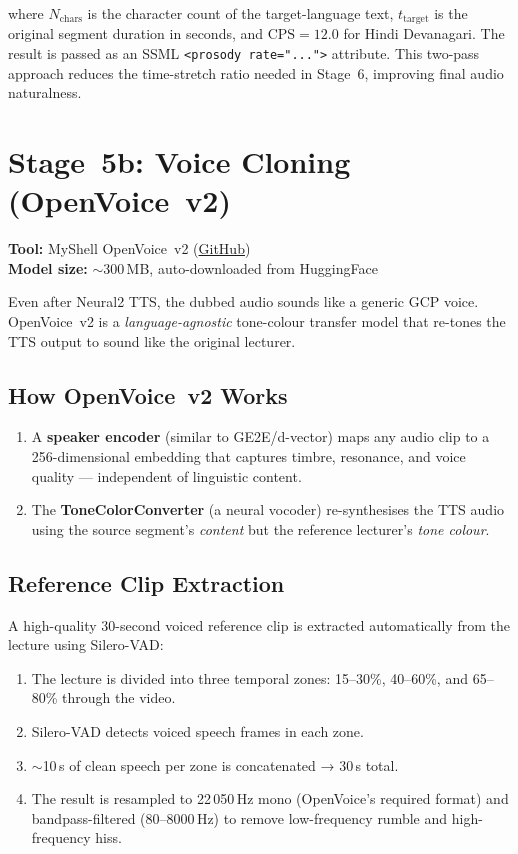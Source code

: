 \documentclass[12pt,a4paper]{article}
\begin{document}
where $N_\text{chars}$ is the character count of the target-language text,
$t_\text{target}$ is the original segment duration in seconds, and
$\text{CPS} = 12.0$ for Hindi Devanagari.  The result is passed as
an SSML \texttt{<prosody rate="...">} attribute.  This two-pass approach
reduces the time-stretch ratio needed in Stage~6, improving final audio
naturalness.

\section{Stage~5b: Voice Cloning (OpenVoice~v2)}

\textbf{Tool:} MyShell OpenVoice~v2 (\href{https://github.com/myshell-ai/OpenVoice}{GitHub})\\
\textbf{Model size:} $\sim$300\,MB, auto-downloaded from HuggingFace

Even after Neural2 TTS, the dubbed audio sounds like a generic GCP voice.
OpenVoice~v2 is a \emph{language-agnostic} tone-colour transfer model that
re-tones the TTS output to sound like the original lecturer.

\subsection{How OpenVoice~v2 Works}

\begin{enumerate}
  \item A \textbf{speaker encoder} (similar to GE2E/d-vector) maps any
        audio clip to a 256-dimensional embedding that captures timbre,
        resonance, and voice quality — independent of linguistic content.
  \item The \textbf{ToneColorConverter} (a neural vocoder) re-synthesises
        the TTS audio using the source segment's \emph{content} but the
        reference lecturer's \emph{tone colour}.
\end{enumerate}

\subsection{Reference Clip Extraction}

A high-quality 30-second voiced reference clip is extracted automatically
from the lecture using Silero-VAD:

\begin{enumerate}
  \item The lecture is divided into three temporal zones: 15--30\%, 40--60\%,
        and 65--80\% through the video.
  \item Silero-VAD detects voiced speech frames in each zone.
  \item $\sim$10\,s of clean speech per zone is concatenated → 30\,s total.
  \item The result is resampled to 22\,050\,Hz mono (OpenVoice's required format)
        and bandpass-filtered (80--8000\,Hz) to remove low-frequency rumble and
        high-frequency hiss.
\end{enumerate}
\end{document}
